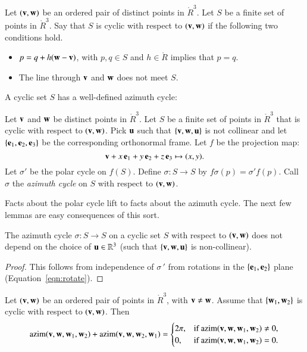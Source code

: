 \begin{definition} Let $({\mathbf v},{\mathbf w})$ be an ordered pair of distinct points in
$\ring{R}^3$.
Let $S$ be a finite set of points in $\ring{R}^3$.
Say that $S$ is cyclic with respect to $({\mathbf v},{\mathbf w})$ if
the following two conditions hold.
\begin{itemize}
\item $p = q + h ({\mathbf w}-{\mathbf v})$, with $p,q\in S$ and $h\in \ring{R}$
implies that $p=q$.  
\item  The line through ${\mathbf v}$ and ${\mathbf w}$ does not meet $S$.
\end{itemize}
\end{definition}
%

A cyclic set $S$ has a well-defined azimuth cycle:

\begin{definition}
Let ${\mathbf v}$ and ${\mathbf w}$ be distinct points in
$\ring{R}^3$.
Let $S$ be a finite set of points in $\ring{R}^3$ that is
cyclic  with respect to $({\mathbf v},{\mathbf w})$.  Pick ${\mathbf u}$ such that $\{{\mathbf v},{\mathbf w},{\mathbf u}\}$ is not collinear and let $\{{\mathbf e}_1,{\mathbf e}_2,{\mathbf e}_3\}$ be the corresponding orthonormal frame.
Let $f$ be the projection map:
   $${\mathbf v} + x\, {\mathbf e}_1 + y\, {\mathbf e}_2 + z\, {\mathbf e}_3 \mapsto
     (x,y).$$
Let $\sigma'$ be the polar cycle on $f(S)$. Define 
$\sigma:S\to S$ by $f\sigma(p) =\sigma'f(p)$.
Call $\sigma$ the {\it azimuth cycle}
on $S$ with respect to $({\mathbf v},{\mathbf w})$.
%
%
%
%
%
\end{definition}

Facts about the polar cycle lift to facts about the azimuth cycle.
The next few lemmas are easy consequences of this sort.


\begin{lemma} The azimuth cycle $\sigma:S\to S$ on
a cyclic set $S$ with respect to $({\mathbf v},{\mathbf w})$ does not depend
on the choice of ${\mathbf u}\in\mathbb{R}^3$ (such that $\{{\mathbf v},{\mathbf w},{\mathbf u}\}$ is non-collinear).
\end{lemma}
%
%

\begin{proof} This follows from independence of $\sigma\,'$ from
rotations in the $\{{\mathbf e}_1,{\mathbf e}_2\}$ plane  (Equation~\ref{eqn:rotate}).
\end{proof}


\begin{lemma} 
Let $({\mathbf v},{\mathbf w})$ be an ordered pair of points in $\ring{R}^3$,
with ${\mathbf v}\ne {\mathbf w}$.  Assume that $\{{\mathbf w}_1,{\mathbf w}_2\}$ is cyclic
with respect to $({\mathbf v},{\mathbf w})$.  Then
  $$
  {\operatorname{azim}}({\mathbf v},{\mathbf w},{\mathbf w}_1,{\mathbf w}_2) + {\operatorname{azim}}({\mathbf v},{\mathbf w},{\mathbf w}_2,{\mathbf w}_1) 
  = \begin{cases} 2\pi, & \text{if }{\operatorname{azim}}({\mathbf v},{\mathbf w},{\mathbf w}_1,{\mathbf w}_2)\ne 0,\\
    0, & \text{if }{\operatorname{azim}}({\mathbf v},{\mathbf w},{\mathbf w}_1,{\mathbf w}_2)=0.
    \end{cases}
    $$
\end{lemma}
%

